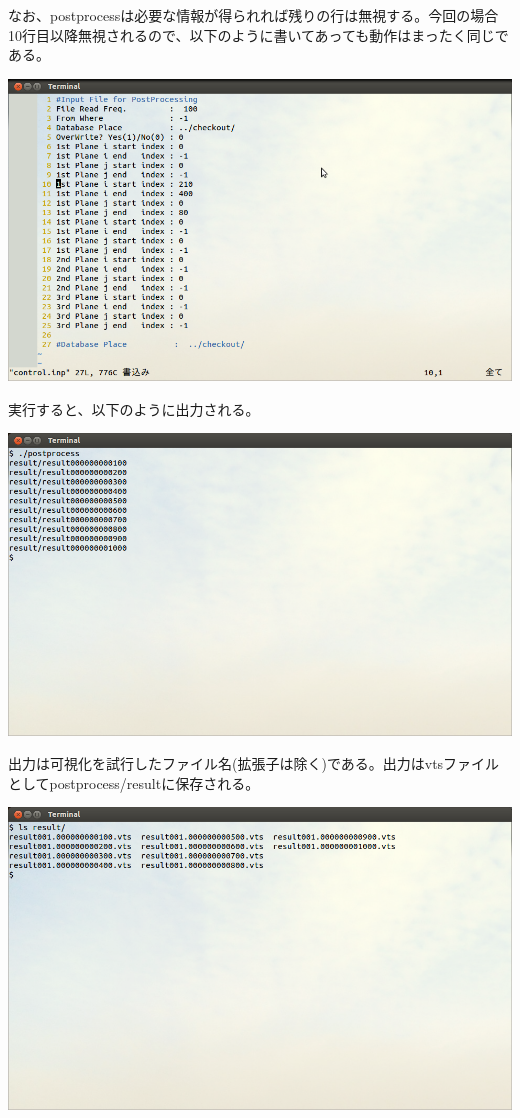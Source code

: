 \documentclass{jsarticle}
\begin{document}
なお、postprocessは必要な情報が得られれば残りの行は無視する。今回の場合10行目以降無視されるので、以下のように書いてあっても動作はまったく同じである。
\begin{center}
\includegraphics[width=.8\textwidth,bb=0 0 962 577]{tutorial_img/240.png}
\end{center}
実行すると、以下のように出力される。
\begin{center}
\includegraphics[width=.8\textwidth,bb=0 0 962 577]{tutorial_img/250.png}
\end{center}
出力は可視化を試行したファイル名(拡張子は除く)である。出力はvtsファイルとしてpostprocess/resultに保存される。
\begin{center}
\includegraphics[width=.8\textwidth,bb=0 0 962 577]{tutorial_img/260.png}
\end{center}
\end{document}
